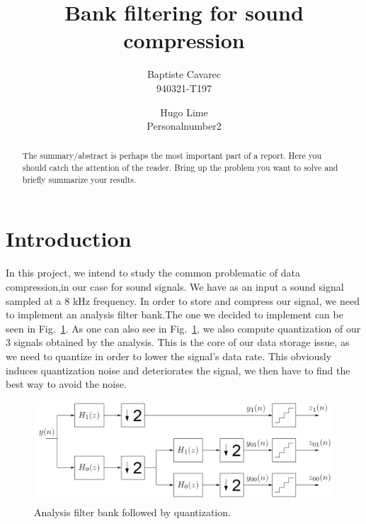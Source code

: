 \documentclass[a4paper,twocolumn]{article}
\begin{document}
\title{Bank filtering for sound compression}
\author{Baptiste Cavarec \\ 940321-T197 \and Hugo Lime\\
  Personalnumber2}

\maketitle


\begin{abstract}
  The summary/abstract is perhaps the most important part of a
  report. Here you should catch the attention of the reader. Bring up
  the problem you want to solve and briefly summarize your results.
\end{abstract}

\section{Introduction}
\label{sec:intro}

In this project, we intend to study the common problematic of data compression,in our case for sound signals. We have as an input a sound signal sampled at a 8 kHz frequency. In order to store and compress our signal, we need to implement an analysis filter bank.The one we decided to implement can be seen in Fig.~\ref{fig:analysis}. As one can also see in Fig.~\ref{fig:analysis}, we also compute quantization of our 3 signals obtained by the analysis. This is the core of our data storage issue, as we need to quantize in order to lower the signal's data rate. This obviously induces quantization noise and deteriorates the signal, we then have to find the best way to avoid the noise.

\begin{figure}[!ht]
  \begin{center}
    \includegraphics[width=0.83\columnwidth]{analysis.png}
  \end{center}
  \caption{Analysis filter bank followed by quantization.}
  \label{fig:analysis}
\end{figure}
\end{document}
